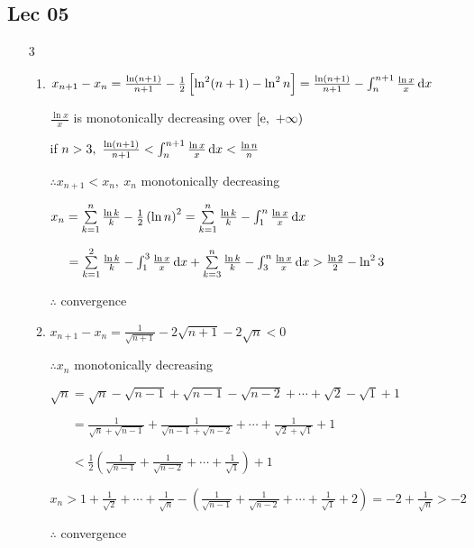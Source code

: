 \subsection{Lec 05}
    \begin{enumerate}[1]
        \item[3]
        \begin{enumerate}[(1)]
            \item $x_{n+1}-x_n=\frac{\ln (n+1)}{n+1} - \frac{1}{2}\left[\ln ^2(n+1)-\ln ^2n\right]=\frac{\ln (n+1)}{n+1} - \int_n^{n+1} \frac{\ln x}{x} \dif x$
            \par  $\frac{\ln x}{x}$ is monotonically decreasing over $[\me ,\ +\infty) $
            \par if $n>3,\  \frac{\ln (n+1)}{n+1}<\int_n^{n+1} \frac{\ln x}{x} \dif x < \frac{\ln n}{n} $
            \par $\therefore x_{n+1}<x_n,\  x_n $ monotonically decreasing
            \par $ x_n =  \sum\limits_{k=1}^n \frac{\ln k}{k} -\frac{1}{2}\left(\ln n \right)^2 = \sum\limits_{k=1}^n \frac{\ln k}{k} - \int_1^{n} \frac{\ln x}{x} \dif x $
            \par $\phantom{x_n} = \sum\limits_{k=1}^2 \frac{\ln k}{k} - \int_1^{3} \frac{\ln x}{x} \dif x + \sum\limits_{k=3}^n \frac{\ln k}{k} - \int_3^{n} \frac{\ln x}{x} \dif x>  \frac{\ln 2}{2} - \ln ^2 3 $
            \par $\therefore $ convergence

            \item $x_{n+1}-x_n = \frac{1}{\sqrt{n+1}} -2\sqrt{n+1} -2\sqrt{n} < 0$
            \par $\therefore x_n $ monotonically decreasing
            \par $ \sqrt{n} = \sqrt{n} -\sqrt{n-1} + \sqrt{n-1} -\sqrt{n-2} + \cdots + \sqrt{2} -\sqrt{1} + 1 $
            \par $ \phantom{\sqrt{n}}= \frac{1}{\sqrt{n} + \sqrt{n-1}} + \frac{1}{\sqrt{n-1} + \sqrt{n-2}}  + \cdots + \frac{1}{\sqrt{2} + \sqrt{1}}  + 1 $
            \par $ \phantom{\sqrt{n}} < \frac{1}{2}\left( \frac{1}{ \sqrt{n-1}} + \frac{1}{ \sqrt{n-2}}  + \cdots + \frac{1}{ \sqrt{1}}\right) + 1 $
            \par $ x_n> 1 +\frac{1}{\sqrt{2}}+\cdots +\frac{1}{\sqrt{n}}-\left( \frac{1}{ \sqrt{n-1}} + \frac{1}{ \sqrt{n-2}}  + \cdots + \frac{1}{ \sqrt{1}}+2\right) =-2 + \frac{1}{\sqrt{n}} > -2 $
            \par $\therefore $ convergence
        \end{enumerate}


\end{enumerate}

